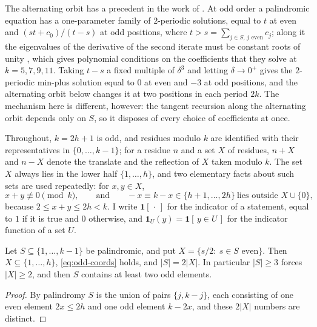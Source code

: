 The alternating orbit has a precedent in the work of
\citet{CimaGasullManosas2004}. At odd order a palindromic equation has a
one-parameter family of $2$-periodic solutions, equal to $t$ at even and
$(st+c_0)/(t-s)$ at odd positions, where $t>s=\sum_{j\in S,\,j\text{ even}}c_j$;
along it the eigenvalues of the derivative of the second iterate must be
constant roots of unity \citep[Proposition~2.6]{CimaGasullManosas2004}, which
gives polynomial conditions on the coefficients that they solve at
$k=5,7,9,11$. Taking $t-s$ a fixed multiple of $\delta^3$ and letting
$\delta\to0^+$ gives the $2$-periodic min-plus solution equal to $0$ at even
and $-3$ at odd positions, and the alternating orbit below changes it at two
positions in each period $2k$. The mechanism here is different, however: the
tangent recursion along the alternating orbit depends only on $S$, so it
disposes of every choice of coefficients at once.

Throughout, $k=2h+1$ is odd, and residues modulo $k$ are identified with
their representatives in $\{0,\dots,k-1\}$; for a residue $n$ and a set $X$
of residues, $n+X$ and $n-X$ denote the translate and the reflection of $X$
taken modulo $k$. The set $X$ always lies in the lower half
$\{1,\dots,h\}$, and two elementary facts about such sets are used
repeatedly: for $x,y\in X$,
\begin{equation}
x+y\not\equiv0\pmod k,
\qquad\text{and}\qquad
-x\equiv k-x\in\{h+1,\dots,2h\}\ \text{lies outside } X\cup\{0\},
\label{eq:odd-half}
\end{equation}
because $2\le x+y\le 2h<k$. I write $\mathbf 1[\,\cdot\,]$ for the indicator
of a statement, equal to $1$ if it is true and $0$ otherwise, and
$\mathbf 1_U(y)=\mathbf 1[\,y\in U\,]$ for the indicator function of a set
$U$.

\begin{lemma}[coordinates]
\label{lem:odd-coords}
Let $S\subseteq\{1,\dots,k-1\}$ be palindromic, and put
$X=\{s/2:\ s\in S\text{ even}\}$. Then $X\subseteq\{1,\dots,h\}$,
\eqref{eq:odd-coords} holds, and $|S|=2|X|$. In particular $|S|\ge3$ forces
$|X|\ge2$, and then $S$ contains at least two odd elements.
\end{lemma}

\begin{proof}
By palindromy $S$ is the union of pairs $\{j,k-j\}$, each consisting of one
even element $2x\le 2h$ and one odd element $k-2x$, and these $2|X|$ numbers
are distinct.
\end{proof}

